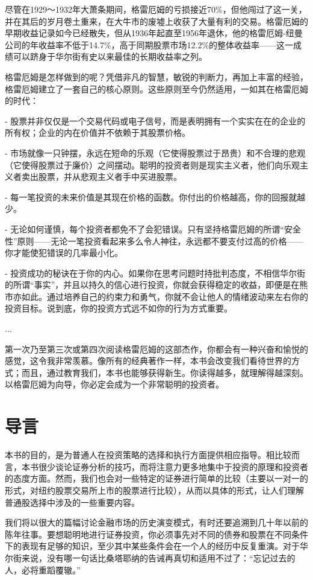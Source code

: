 \documentclass[12pt,oneside]{book}
\begin{document}
尽管在1929～1932年大萧条期间，格雷厄姆的亏损接近70\%，但他闯过了这一关，并在其后的岁月卷土重来，在大牛市的废墟上收获了大量有利的交易。格雷厄姆的早期收益记录如今已经散失，但从1936年起直至1956年退休，他的格雷厄姆-纽曼公司的年收益率不低于14.7\%，高于同期股票市场12.2\%的整体收益率——这一成绩可以跻身于华尔街有史以来最佳的长期收益率之列。

格雷厄姆是怎样做到的呢？凭借非凡的智慧，敏锐的判断力，再加上丰富的经验，格雷厄姆建立了一套自己的核心原则。这些原则至今仍然适用，一如其在格雷厄姆的时代：

- 股票并非仅仅是一个交易代码或电子信号，而是表明拥有一个实实在在的企业的所有权；企业的内在价值并不依赖于其股票价格。

- 市场就像一只钟摆，永远在短命的乐观（它使得股票过于昂贵）和不合理的悲观（它使得股票过于廉价）之间摆动。聪明的投资者则是现实主义者，他们向乐观主义者卖出股票，并从悲观主义者手中买进股票。

- 每一笔投资的未来价值是其现在价格的函数。你付出的价格越高，你的回报就越少。

- 无论如何谨慎，每个投资者都免不了会犯错误。只有坚持格雷厄姆的所谓“安全性”原则——无论一笔投资看起来多么令人神往，永远都不要支付过高的价格——你才能使犯错误的几率最小化。

- 投资成功的秘诀在于你的内心。如果你在思考问题时持批判态度，不相信华尔街的所谓“事实”，并且以持久的信心进行投资，你就会获得稳定的收益，即便是在熊市亦如此。通过培养自己的约束力和勇气，你就不会让他人的情绪波动来左右你的投资目标。说到底，你的投资方式远不如你的行为方式重要。

...

第一次乃至第三次或第四次阅读格雷厄姆的这部杰作，你都会有一种兴奋和愉悦的感觉，这令我非常羡慕。像所有的经典著作一样，本书会改变我们看待世界的方式；而且，通过教育我们，本书也能够获得新生。你读得越多，就理解得越深刻。以格雷厄姆为向导，你必定会成为一个非常聪明的投资者。

\section{导言}
本书的目的，是为普通人在投资策略的选择和执行方面提供相应指导。相比较而言，本书很少谈论证券分析的技巧，而将注意力更多地集中于投资的原理和投资者的态度方面。然而，我们也会对一些特定的证券进行简单的比较（主要以一对一的形式，对纽约股票交易所上市的股票进行比较），从而以具体的形式，让人们理解普通股选择中涉及的一些重要内容。

我们将以很大的篇幅讨论金融市场的历史演变模式，有时还要追溯到几十年以前的陈年往事。要想聪明地进行证券投资，你必须事先对不同的债券和股票在不同条件下的表现有足够的知识，至少其中某些条件会在一个人的经历中反复重演。对于华尔街来说，没有哪一句话比桑塔耶纳的告诫再真切和适用不过了：“忘记过去的人，必将重蹈覆辙。”
\end{document}
